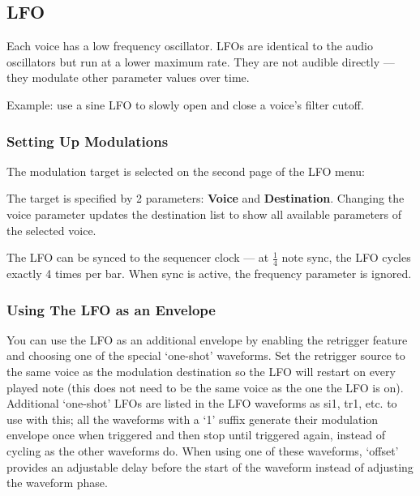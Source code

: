 \subsection{LFO}\label{lfo}

Each voice has a low frequency oscillator. LFOs are identical to the
audio oscillators but run at a lower maximum rate. They are not audible
directly --- they modulate other parameter values over time.

Example: use a sine LFO to slowly open and close a voice's filter
cutoff.

\subsubsection{Setting Up Modulations}\label{setting-up-modulations}

The modulation target is selected on the second page of the LFO menu:


The target is specified by 2 parameters: \textbf{Voice} and
\textbf{Destination}. Changing the voice parameter updates the
destination list to show all available parameters of the selected voice.


The LFO can be synced to the sequencer clock --- at \(\frac{1}{4}\) note
sync, the LFO cycles exactly 4 times per bar. When sync is active, the
frequency parameter is ignored.

\subsubsection{Using The LFO as an
Envelope}\label{using-the-lfo-as-an-envelope}

You can use the LFO as an additional envelope by enabling the retrigger
feature and choosing one of the special `one-shot' waveforms. Set the
retrigger source to the same voice as the modulation destination so the
LFO will restart on every played note (this does not need to be the same
voice as the one the LFO is on). Additional `one-shot' LFOs are listed
in the LFO waveforms as si1, tr1, etc. to use with this; all the
waveforms with a `1' suffix generate their modulation envelope once when
triggered and then stop until triggered again, instead of cycling as the
other waveforms do. When using one of these waveforms, `offset' provides
an adjustable delay before the start of the waveform instead of
adjusting the waveform phase.

